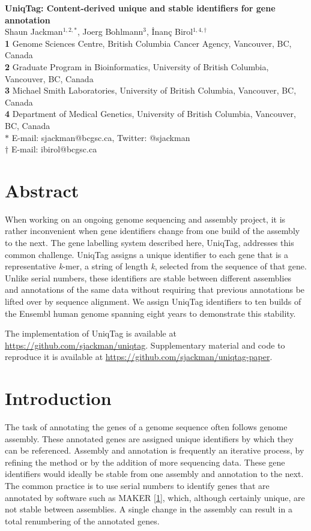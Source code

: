 \documentclass[10pt]{article}
\date{}
\begin{document}
\begin{flushleft}
{\large
\textbf{UniqTag: Content-derived unique and stable identifiers for gene annotation}
}
\\
Shaun Jackman$^{1,2,\ast}$,
Joerg Bohlmann$^{3}$,
\.{I}nan\c{c} Birol$^{1,4,\dagger}$
\\ \textbf{1} Genome Sciences Centre, British Columbia Cancer Agency, Vancouver, BC, Canada
\\ \textbf{2} Graduate Program in Bioinformatics, University of British Columbia, Vancouver, BC, Canada
\\ \textbf{3} Michael Smith Laboratories, University of British Columbia, Vancouver, BC, Canada
\\ \textbf{4} Department of Medical Genetics, University of British Columbia, Vancouver, BC, Canada
\\ $\ast$ E-mail: sjackman@bcgsc.ca, Twitter: @sjackman
\\ $\dagger$ E-mail: ibirol@bcgsc.ca
\end{flushleft}
\section{Abstract}\label{abstract}

When working on an ongoing genome sequencing and assembly project, it is
rather inconvenient when gene identifiers change from one build of the
assembly to the next. The gene labelling system described here, UniqTag,
addresses this common challenge. UniqTag assigns a unique identifier to
each gene that is a representative \emph{k}-mer, a string of length
\emph{k}, selected from the sequence of that gene. Unlike serial
numbers, these identifiers are stable between different assemblies and
annotations of the same data without requiring that previous annotations
be lifted over by sequence alignment. We assign UniqTag identifiers to
ten builds of the Ensembl human genome spanning eight years to
demonstrate this stability.

The implementation of UniqTag is available at
\url{https://github.com/sjackman/uniqtag}. Supplementary material and
code to reproduce it is available at
\url{https://github.com/sjackman/uniqtag-paper}.

\section{Introduction}\label{introduction}

The task of annotating the genes of a genome sequence often follows
genome assembly. These annotated genes are assigned unique identifiers
by which they can be referenced. Assembly and annotation is frequently
an iterative process, by refining the method or by the addition of more
sequencing data. These gene identifiers would ideally be stable from one
assembly and annotation to the next. The common practice is to use
serial numbers to identify genes that are annotated by software such as
MAKER {[}\href{http://dx.doi.org/10.1104/pp.113.230144}{1}{]}, which,
although certainly unique, are not stable between assemblies. A single
change in the assembly can result in a total renumbering of the
annotated genes.
\end{document}
